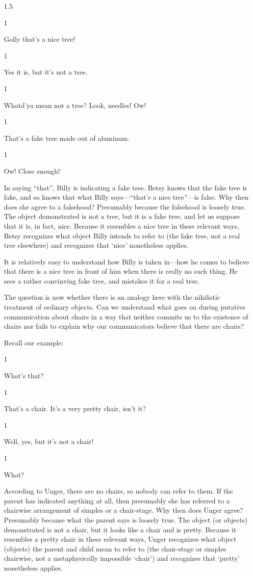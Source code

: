 \documentclass[11pt]{standalone} \newif\ifstandlone \standalonetrue
\newcommand{\stage}[3]%
{%
	\begin{spacing}{1}%
	\vspace{0pt}
		\begin{description}[style=nextline, parsep=0pt,
                    leftmargin=15mm, itemindent=-10mm, font=\mdseries]
			\item[\textsc{#1} \emph{#2}] #3
		\end{description}%
	\end{spacing}%
}
\begin{document}
\begin{spacing}{1.5}
\stage{Billy}{(pointing)}{Golly that's a nice tree!}

\stage{Betsy}{}{Yes it is, but it's not a tree.}

\stage{Billy}{}{Whatd'ya mean not a tree?  Look, needles!  Ow!}

\stage{Betsy}{}{That's a fake tree made out of aluminum.}

\stage{Billy}{}{Ow!  Close enough!}

In saying ``that'', Billy is indicating a fake tree.  Betsy knows that
the fake tree is fake, and so knows that what Billy says---``that's a
nice tree''---is false.  Why then does she agree to a falsehood?
Presumably because the falsehood is loosely true.  The object
demonstrated is not a tree, but it is a fake tree, and let us suppose
that it is, in fact, nice.  Because it resembles a nice tree in these
relevant ways, Betsy recognizes what object Billy intends to refer to
(the fake tree, not a real tree elsewhere) and recognizes that
`nice' nonetheless applies.

It is relatively easy to understand how Billy is taken in---how he
comes to believe that there is a nice tree in front of him when there
is really no such thing.  He sees a rather convinving fake tree, and
mistakes it for a real tree.

The question is now whether there is an analogy here with the
nihilistic treatment of ordinary objects.  Can we understand what goes
on during putative communication about chairs in a way that neither
commits us to the existence of chairs nor fails to explain why our
communicators believe that there are chairs?

Recall our example:

\stage{Child}{}{What's that?}

\stage{Parent}{}{That's a chair.  It's a very pretty chair, isn't it?}

\stage{Peter Unger}{(runs in)}{Well, yes, but it's not a chair!}

\stage{Parent}{}{What?}

According to Unger, there are no chairs, so nobody can refer to them.
If the parent has indicated anything at all, then presumably she has
referred to a chairwise arrangement of simples or a chair-stage.  Why
then does Unger agree?  Presumably because what the parent says is
loosely true.  The object (or objects) demonstrated is not a chair,
but it looks like a chair and is pretty.  Because it resembles a
pretty chair in these relevant ways, Unger recognizes what object
(objects) the parent and child mean to refer to (the chair-stage or
simples chairwise, not a metaphysically impossible `chair') and
recognizes that `pretty' nonetheless applies.


\end{spacing}
\end{document}
